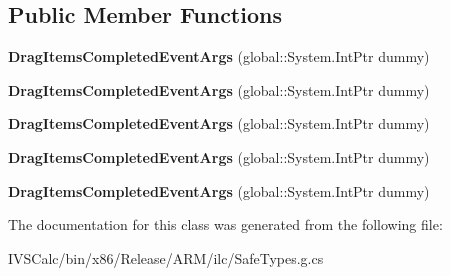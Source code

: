 \subsection*{Public Member Functions}
\begin{DoxyCompactItemize}
\item 
\mbox{\label{class_windows_1_1_u_i_1_1_xaml_1_1_controls_1_1_drag_items_completed_event_args_a3b9e86ebbeefe3ce2814325adb8343e8}} 
{\bfseries Drag\+Items\+Completed\+Event\+Args} (global\+::\+System.\+Int\+Ptr dummy)
\item 
\mbox{\label{class_windows_1_1_u_i_1_1_xaml_1_1_controls_1_1_drag_items_completed_event_args_a3b9e86ebbeefe3ce2814325adb8343e8}} 
{\bfseries Drag\+Items\+Completed\+Event\+Args} (global\+::\+System.\+Int\+Ptr dummy)
\item 
\mbox{\label{class_windows_1_1_u_i_1_1_xaml_1_1_controls_1_1_drag_items_completed_event_args_a3b9e86ebbeefe3ce2814325adb8343e8}} 
{\bfseries Drag\+Items\+Completed\+Event\+Args} (global\+::\+System.\+Int\+Ptr dummy)
\item 
\mbox{\label{class_windows_1_1_u_i_1_1_xaml_1_1_controls_1_1_drag_items_completed_event_args_a3b9e86ebbeefe3ce2814325adb8343e8}} 
{\bfseries Drag\+Items\+Completed\+Event\+Args} (global\+::\+System.\+Int\+Ptr dummy)
\item 
\mbox{\label{class_windows_1_1_u_i_1_1_xaml_1_1_controls_1_1_drag_items_completed_event_args_a3b9e86ebbeefe3ce2814325adb8343e8}} 
{\bfseries Drag\+Items\+Completed\+Event\+Args} (global\+::\+System.\+Int\+Ptr dummy)
\end{DoxyCompactItemize}


The documentation for this class was generated from the following file\+:\begin{DoxyCompactItemize}
\item 
I\+V\+S\+Calc/bin/x86/\+Release/\+A\+R\+M/ilc/Safe\+Types.\+g.\+cs\end{DoxyCompactItemize}
